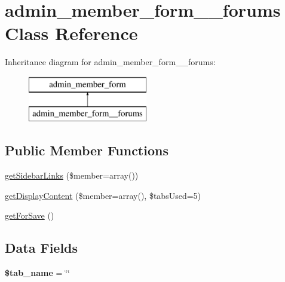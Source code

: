 \hypertarget{classadmin__member__form____forums}{\section{admin\-\_\-member\-\_\-form\-\_\-\-\_\-forums Class Reference}
\label{classadmin__member__form____forums}
}
Inheritance diagram for admin\-\_\-member\-\_\-form\-\_\-\-\_\-forums\-:\begin{figure}[H]
\begin{center}
\leavevmode
\includegraphics[height=2.000000cm]{classadmin__member__form____forums}
\end{center}
\end{figure}
\subsection*{Public Member Functions}
\begin{DoxyCompactItemize}
\item 
\hyperlink{classadmin__member__form____forums_aa06c25b69a518bbb6eaaaf6a84047f04}{get\-Sidebar\-Links} (\$member=array())
\item 
\hyperlink{classadmin__member__form____forums_af3da842ede1e6d212629fd0eda2bfbcc}{get\-Display\-Content} (\$member=array(), \$tabs\-Used=5)
\item 
\hyperlink{classadmin__member__form____forums_aa584200e117d7f02d4fabc05b109e51f}{get\-For\-Save} ()
\end{DoxyCompactItemize}
\subsection*{Data Fields}
\begin{DoxyCompactItemize}
\item 
\hypertarget{classadmin__member__form____forums_a924f0502d852ff2259cef00e4fa12d94}{{\bfseries \$tab\-\_\-name} = \char`\"{}\char`\"{}}\label{classadmin__member__form____forums_a924f0502d852ff2259cef00e4fa12d94}

\end{DoxyCompactItemize}


